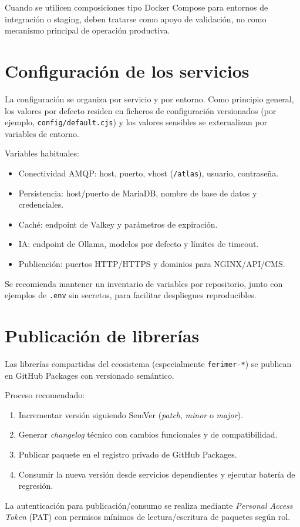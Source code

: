 Cuando se utilicen composiciones tipo Docker Compose para entornos de integración o staging, deben tratarse como apoyo de validación, no como mecanismo principal de operación productiva.

\section{Configuración de los servicios}

La configuración se organiza por servicio y por entorno. Como principio general, los valores por defecto residen en ficheros de configuración versionados (por ejemplo, \texttt{config/default.cjs}) y los valores sensibles se externalizan por variables de entorno.

Variables habituales:

\begin{itemize}
\item Conectividad AMQP: host, puerto, vhost (\texttt{/atlas}), usuario, contraseña.
\item Persistencia: host/puerto de MariaDB, nombre de base de datos y credenciales.
\item Caché: endpoint de Valkey y parámetros de expiración.
\item IA: endpoint de Ollama, modelos por defecto y límites de timeout.
\item Publicación: puertos HTTP/HTTPS y dominios para NGINX/API/CMS.
\end{itemize}

Se recomienda mantener un inventario de variables por repositorio, junto con ejemplos de \texttt{.env} sin secretos, para facilitar despliegues reproducibles.

\section{Publicación de librerías}

Las librerías compartidas del ecosistema (especialmente \texttt{ferimer-*}) se publican en GitHub Packages con versionado semántico.

Proceso recomendado:

\begin{enumerate}
\item Incrementar versión siguiendo SemVer (\textit{patch}, \textit{minor} o \textit{major}).
\item Generar \textit{changelog} técnico con cambios funcionales y de compatibilidad.
\item Publicar paquete en el registro privado de GitHub Packages.
\item Consumir la nueva versión desde servicios dependientes y ejecutar batería de regresión.
\end{enumerate}

La autenticación para publicación/consumo se realiza mediante \textit{Personal Access Token} (PAT) con permisos mínimos de lectura/escritura de paquetes según rol.
